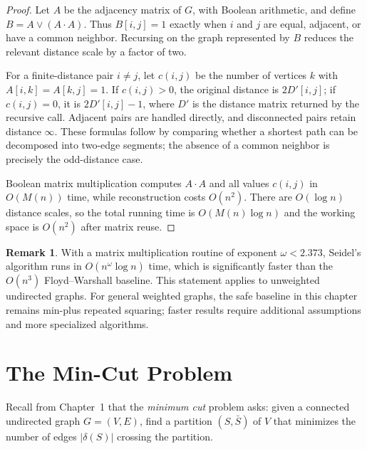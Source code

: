 \documentclass[twoside,12pt]{book}
\theoremstyle{plain}
\theoremstyle{definition}
\newtheorem{remark}[theorem]{Remark}
\theoremstyle{remark}
\begin{document}
\begin{proof}
Let $A$ be the adjacency matrix of $G$, with Boolean arithmetic, and define
$B=A\lor(A\cdot A)$. Thus $B[i,j]=1$ exactly when $i$ and $j$ are equal,
adjacent, or have a common neighbor. Recursing on the graph represented by
$B$ reduces the relevant distance scale by a factor of two.

For a finite-distance pair $i\ne j$, let $c(i,j)$ be the number of vertices
$k$ with $A[i,k]=A[k,j]=1$. If $c(i,j)>0$, the original distance is
$2D'[i,j]$; if $c(i,j)=0$, it is $2D'[i,j]-1$, where $D'$ is the distance
matrix returned by the recursive call. Adjacent pairs are handled directly,
and disconnected pairs retain distance $\infty$. These formulas follow by
comparing whether a shortest path can be decomposed into two-edge segments;
the absence of a common neighbor is precisely the odd-distance case.

Boolean matrix multiplication computes $A\cdot A$ and all values $c(i,j)$ in
$O(M(n))$ time, while reconstruction costs $O(n^2)$. There are
$O(\log n)$ distance scales, so the total running time is
$O(M(n)\log n)$ and the working space is $O(n^2)$ after matrix reuse.
\end{proof}

\begin{remark}
With a matrix multiplication routine of exponent $\omega<2.373$, Seidel's
algorithm runs in $O(n^{\omega}\log n)$ time, which is significantly faster
than the $O(n^3)$ Floyd--Warshall baseline. This statement applies to
unweighted undirected graphs. For general weighted graphs, the safe baseline
in this chapter remains min-plus repeated squaring; faster results require
additional assumptions and more specialized algorithms.
\end{remark}



\section{The Min-Cut Problem}
\label{sec:min-cut}

Recall from Chapter~1 that the \emph{minimum cut} problem asks: given a connected undirected graph $G = (V, E)$, find a partition $(S, \bar{S})$ of $V$ that minimizes the number of edges $|\delta(S)|$ crossing the partition.
\end{document}
